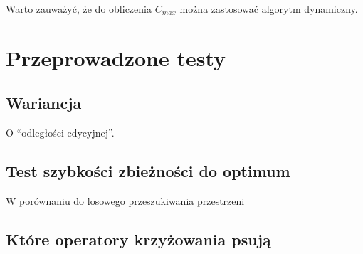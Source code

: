 \documentclass[12pt]{article}
\begin{document}
Warto zauważyć, że do obliczenia $C_{max}$ można zastosować algorytm dynamiczny. 

\section{Przeprowadzone testy}
\subsection{Wariancja}
O ``odległości edycyjnej''.
\subsection{Test szybkości zbieżności do optimum}
W porównaniu do losowego przeszukiwania przestrzeni
\subsection{Które operatory krzyżowania psują}
\end{document}
